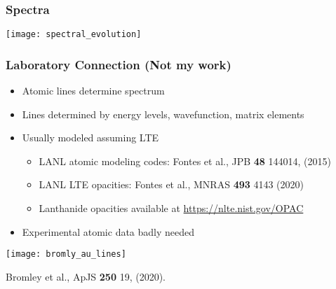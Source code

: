 \documentclass[]{beamer}
\begin{document}
\begin{frame}
  \frametitle{Spectra}
  \begin{center}
    \texttt{[image: spectral\_evolution]}
  \end{center}
\end{frame}

\begin{frame}
  \frametitle{Laboratory Connection (Not my work)}
  \begin{itemize}
  \item Atomic lines determine spectrum
  \item Lines determined by energy levels, wavefunction, matrix elements
  \item Usually modeled assuming LTE    \begin{itemize}
    \item LANL atomic modeling codes: Fontes et al., JPB \textbf{48}
      144014, (2015)
    \item LANL LTE opacities: Fontes et al., MNRAS \textbf{493} 4143 (2020)
    \item Lanthanide opacities available at \url{https://nlte.nist.gov/OPAC}
    \end{itemize}
  \item Experimental atomic data badly needed
  \end{itemize}
  \begin{center}
    \texttt{[image: bromly\_au\_lines]}\\
    \begin{small}
      Bromley et al., ApJS \textbf{250} 19, (2020).
    \end{small}
  \end{center}
\end{frame}
\end{document}
